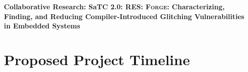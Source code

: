 \documentclass[11pt,oneside,onecolumn,letterpaper]{article}
\newcommand{\sysname}{{\scshape Forge}\xspace}
\begin{document}

\begin{center}
{\large{\bf
Collaborative Research: SaTC 2.0: RES: \sysname: Characterizing, Finding, and Reducing Compiler-Introduced Glitching Vulnerabilities in Embedded Systems}}
\end{center}

















\section{Proposed Project Timeline}
\end{document}
